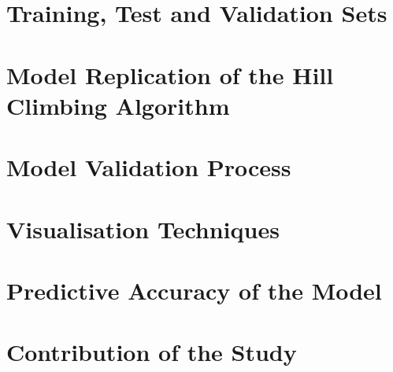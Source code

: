 \documentclass{article}[14pt]
\begin{document}
\linespread{1.25}


\tableofcontents

\newpage

\section{Training, Test and Validation Sets}

\section{Model Replication of the Hill Climbing Algorithm}

\section{Model Validation Process}

\section{Visualisation Techniques}

\section{Predictive Accuracy of the Model}
\section{Contribution of the Study}
\printbibliography
\end{document}
